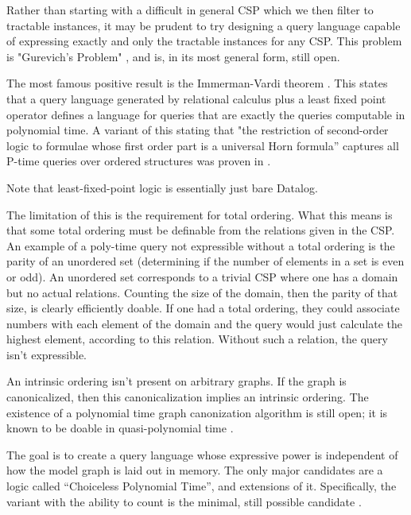Rather than starting with a difficult in general CSP which we then filter to tractable instances, it may be prudent to try designing a query language capable of expressing exactly and only the tractable instances for any CSP. This problem is "Gurevich’s Problem" \citep{gurevich1985logic}, and is, in its most general form, still open.

The most famous positive result is the Immerman-Vardi theorem \citep{immerman1982relational}. This states that a query language generated by relational calculus plus a least fixed point operator defines a language for queries that are exactly the queries computable in polynomial time. A variant of this stating that "the restriction of second-order logic to formulae whose first order part is a universal Horn formula” captures all P-time queries over ordered structures was proven in \citep{gradel1991expressive}.

\begin{remark}
Note that least-fixed-point logic is essentially just bare Datalog.
\end{remark}

The limitation of this is the requirement for total ordering. What this means is that some total ordering must be definable from the relations given in the CSP. An example of a poly-time query not expressible without a total ordering is the parity of an unordered set (determining if the number of elements in a set is even or odd). An unordered set corresponds to a trivial CSP where one has a domain but no actual relations. Counting the size of the domain, then the parity of that size, is clearly efficiently doable. If one had a total ordering, they could associate numbers with each element of the domain and the query would just calculate the highest element, according to this relation. Without such a relation, the query isn't expressible.

An intrinsic ordering isn't present on arbitrary graphs. If the graph is canonicalized, then this canonicalization implies an intrinsic ordering. The existence of a polynomial time graph canonization algorithm is still open; it is known to be doable in quasi-polynomial time \citep{wiebking2021decomposition}.

The goal is to create a query language whose expressive power is independent of how the model graph is laid out in memory. The only major candidates are a logic called “Choiceless Polynomial Time”, and extensions of it. Specifically, the variant with the ability to count is the minimal, still possible candidate \citep{blass1999choiceless}.


